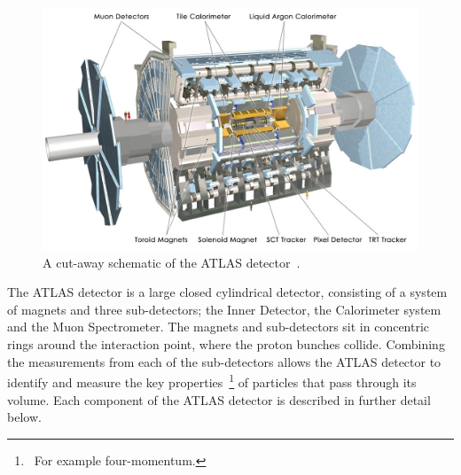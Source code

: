 \begin{figure}[!htb]
  \begin{center}
    \includegraphics[width=1\linewidth, angle=0]{figs/Detector/ATLAS_schem.jpg}
  \end{center}
  \caption[A cut-away schematic of the ATLAS detector.]{ A cut-away schematic of the ATLAS detector~\cite{det-ATLAS_Exp}.}
  \label{fig:det-ATLAS_schem}
\end{figure}

\clearpage
The ATLAS detector is a large closed cylindrical detector,
consisting of a system of magnets and three sub-detectors; the Inner Detector, the Calorimeter system and the Muon Spectrometer.
The magnets and sub-detectors sit in concentric rings around the interaction point, where the proton bunches collide.
Combining the measurements from each of the sub-detectors allows the 
ATLAS detector to identify and measure the key properties~\footnote{\ For example four-momentum.}
of particles that pass through its volume.
Each component of the ATLAS detector is described in further detail below.



